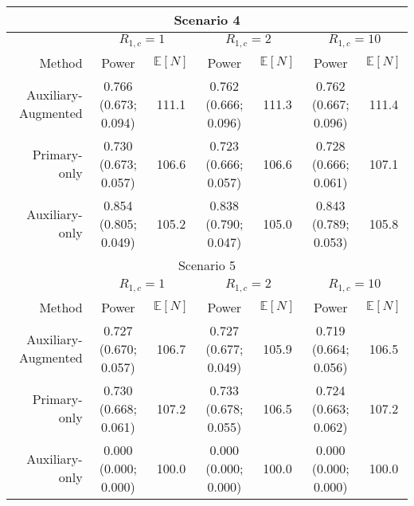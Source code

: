 \begin{tabular}{r|cc|cc|cc}
\bottomrule 
\multicolumn{7}{c}{Scenario 4}\\ 
\midrule 
& \multicolumn{2}{c}{$R_{1,c}= 1$} & \multicolumn{2}{c}{$R_{1,c} = 2$} & \multicolumn{2}{c}{$R_{1,c} = 10$} \\ 
Method &  Power &   $\mathbb E[N]$ &
               Power &   $\mathbb E[N]$ &
               Power &   $\mathbb E[N]$  \\ 
Auxiliary-Augmented &0.766  (0.673; 0.094) & 111.1 &0.762  (0.666; 0.096) & 111.3 &0.762  (0.667; 0.096) & 111.4 \\ 
Primary-only &0.730  (0.673; 0.057) & 106.6 &0.723  (0.666; 0.057) & 106.6 &0.728  (0.666; 0.061) & 107.1 \\ 
Auxiliary-only &0.854  (0.805; 0.049) & 105.2 &0.838  (0.790; 0.047) & 105.0 &0.843  (0.789; 0.053) & 105.8 \\ 
\bottomrule 
\multicolumn{7}{c}{Scenario 5}\\ 
\midrule 
& \multicolumn{2}{c}{$R_{1,c}= 1$} & \multicolumn{2}{c}{$R_{1,c} = 2$} & \multicolumn{2}{c}{$R_{1,c} = 10$} \\ 
Method &  Power &   $\mathbb E[N]$ &
               Power &   $\mathbb E[N]$ &
               Power &   $\mathbb E[N]$  \\ 
Auxiliary-Augmented &0.727  (0.670; 0.057) & 106.7 &0.727  (0.677; 0.049) & 105.9 &0.719  (0.664; 0.056) & 106.5 \\ 
Primary-only &0.730  (0.668; 0.061) & 107.2 &0.733  (0.678; 0.055) & 106.5 &0.724  (0.663; 0.062) & 107.2 \\ 
Auxiliary-only &0.000  (0.000; 0.000) & 100.0 &0.000  (0.000; 0.000) & 100.0 &0.000  (0.000; 0.000) & 100.0 \\ 
\bottomrule 
\end{tabular} 
